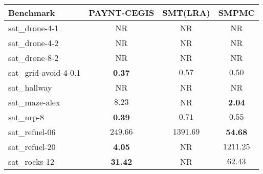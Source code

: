 \begin{tabular}{lccc}
\toprule
Benchmark & PAYNT-CEGIS & SMT(LRA) & SMPMC \\
\midrule
sat\_drone-4-1 & NR & NR & NR \\
sat\_drone-4-2 & NR & NR & NR \\
sat\_drone-8-2 & NR & NR & NR \\
sat\_grid-avoid-4-0.1 & \textbf{0.37} & $0.57$ & $0.50$ \\
sat\_hallway & NR & NR & NR \\
sat\_maze-alex & $8.23$ & NR & \textbf{2.04} \\
sat\_nrp-8 & \textbf{0.39} & $0.71$ & $0.55$ \\
sat\_refuel-06 & $249.66$ & $1391.69$ & \textbf{54.68} \\
sat\_refuel-20 & \textbf{4.05} & NR & $1211.25$ \\
sat\_rocks-12 & \textbf{31.42} & NR & $62.43$ \\
\bottomrule
\end{tabular}
